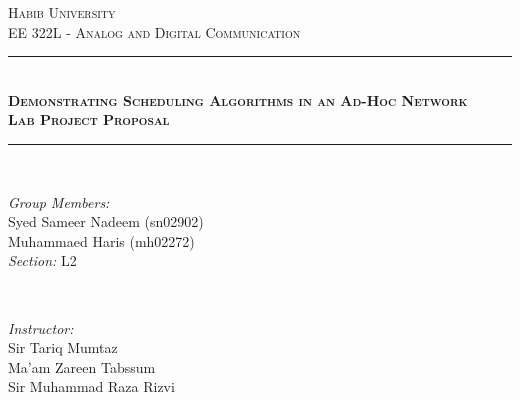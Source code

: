 \documentclass[12pt]{article}
\begin{document}
\setlength{\parskip}{10pt} %
\setlength{\parindent}{0pt}

\begin{titlepage}

\newcommand{\HRule}{\rule{\linewidth}{0.5mm}} %

\center %
 

\textsc{\LARGE Habib University}\\[1.5cm] %
\textsc{\Large EE 322L - Analog and Digital Communication}\\[0.5cm] %


\HRule \\[0.4cm]
{ \huge \bfseries \textsc{Demonstrating Scheduling Algorithms in an Ad-Hoc Network} }\\[0.4cm] %
{ \large \bfseries \textsc{Lab Project Proposal} }\\[0.4cm] 
\HRule \\[1.5cm]
 
\begin{minipage}{0.4\textwidth}
\begin{flushleft} \large
\emph{Group Members:}\\
Syed Sameer Nadeem (sn02902)\\
Muhammaed Haris (mh02272)\\
\emph{Section:}
L2\\
\end{flushleft}
\end{minipage}
~
\begin{minipage}{0.4\textwidth}
\begin{flushright} \large
\emph{Instructor:} \\
Sir Tariq Mumtaz \\
Ma'am Zareen Tabssum\\
Sir Muhammad Raza Rizvi
\end{flushright}
\end{minipage}\\[2cm]


\end{titlepage}
\end{document}
